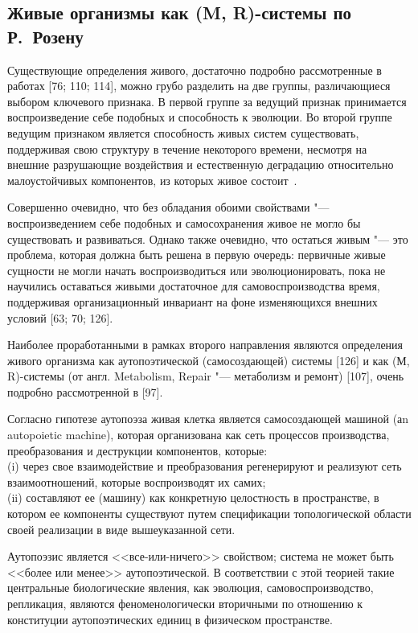 \documentclass[12pt,a4paper,oneside]{book}
\begin{document}
\subsection{Живые организмы как (M, R)-системы по Р.~Розену}

Существующие определения живого, достаточно подробно рассмотренные в работах [76; 110; 114], можно грубо разделить на две группы, различающиеся выбором ключевого признака. В первой группе за ведущий признак принимается воспроизведение себе подобных и способность к эволюции. Во второй группе ведущим признаком является способность живых систем существовать, поддерживая свою структуру в течение некоторого времени, несмотря на внешние разрушающие воздействия и естественную деградацию относительно малоустойчивых компонентов, из которых живое состоит~\cite{Rozen1969}.

Совершенно очевидно, что без обладания обоими свойствами "--- воспроизведением себе подобных и самосохранения живое не могло бы существовать и развиваться. Однако также очевидно, что остаться живым "--- это проблема, которая должна быть решена в первую очередь: первичные живые сущности не могли начать воспроизводиться или эволюционировать, пока не научились оставаться живыми достаточное для самовоспроизводства время, поддерживая организационный инвариант на фоне изменяющихся внешних условий [63; 70; 126].

Наиболее проработанными в рамках второго направления являются определения живого организма как аутопоэтической (самосоздающей) системы [126] и как (М, R)-системы (от англ. Metabolism, Repair "--- метаболизм и ремонт) [107], очень подробно рассмотренной в [97].

Согласно гипотезе аутопоэза живая клетка является самосоздающей машиной (аn autopoietic machine), которая организована как сеть процессов производства, преобразования и деструкции компонентов, которые:\\
(i) через свое взаимодействие и преобразования регенерируют и реализуют сеть взаимоотношений, которые воспроизводят их самих;\\
(ii) составляют ее (машину) как конкретную целостность в пространстве, в котором ее компоненты существуют путем спецификации топологической области своей реализации в виде вышеуказанной сети.

Аутопоэзис является <<все-или-ничего>> свойством; система не может быть <<более или менее>> аутопоэтической. В соответствии с этой теорией такие центральные биологические явления, как эволюция, самовоспроизводство, репликация, являются феноменологически вторичными по отношению к конституции аутопоэтических единиц в физическом пространстве.
\end{document}
